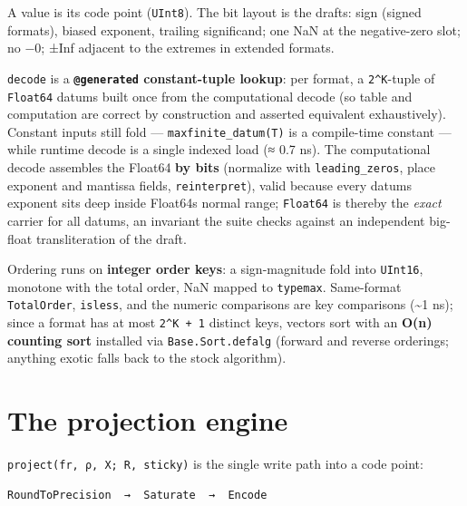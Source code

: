 \label{8606053261248653135}{}


A value is its code point (\texttt{UInt8}). The bit layout is the draft{\textquotesingle}s: sign (signed formats), biased exponent, trailing significand; one NaN at the negative-zero slot; no −0; ±Inf adjacent to the extremes in extended formats.



\texttt{decode} is a \textbf{\texttt{@generated} constant-tuple lookup}: per format, a \texttt{2{\textasciicircum}K}-tuple of \texttt{Float64} datums built once from the computational decode (so table and computation are correct by construction and asserted equivalent exhaustively). Constant inputs still fold — \texttt{maxfinite\_datum(T)} is a compile-time constant — while runtime decode is a single indexed load (≈ 0.7 ns). The computational decode assembles the Float64 \textbf{by bits} (normalize with \texttt{leading\_zeros}, place exponent and mantissa fields, \texttt{reinterpret}), valid because every datum{\textquotesingle}s exponent sits deep inside Float64{\textquotesingle}s normal range; \texttt{Float64} is thereby the \emph{exact} carrier for all datums, an invariant the suite checks against an independent big-float transliteration of the draft.



Ordering runs on \textbf{integer order keys}: a sign-magnitude fold into \texttt{UInt16}, monotone with the total order, NaN mapped to \texttt{typemax}. Same-format \texttt{TotalOrder}, \texttt{isless}, and the numeric comparisons are key comparisons ({\textasciitilde}1 ns); since a format has at most \texttt{2{\textasciicircum}K + 1} distinct keys, vectors sort with an \textbf{O(n) counting sort} installed via \texttt{Base.Sort.defalg} (forward and reverse orderings; anything exotic falls back to the stock algorithm).



\section{The projection engine}



\label{8339828346285081570}{}


\texttt{project(fr, ρ, X; R, sticky)} is the single write path into a code point:




\begin{verbatim}
RoundToPrecision  →  Saturate  →  Encode
\end{verbatim}



